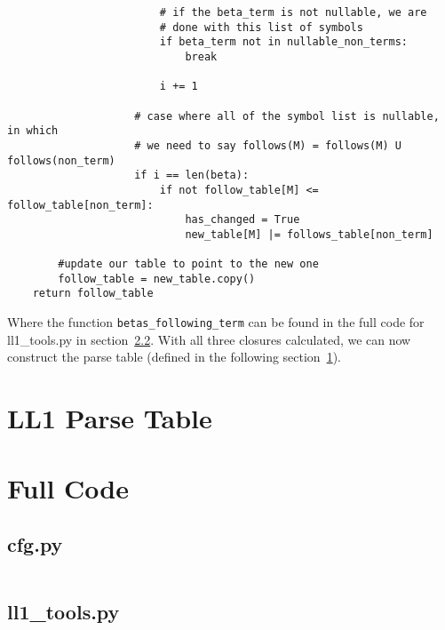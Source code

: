 \documentclass{article}
\begin{document}
\begin{verbatim}
                        # if the beta_term is not nullable, we are
                        # done with this list of symbols
                        if beta_term not in nullable_non_terms:
                            break

                        i += 1
                    
                    # case where all of the symbol list is nullable, in which
                    # we need to say follows(M) = follows(M) U follows(non_term)
                    if i == len(beta):
                        if not follow_table[M] <= follow_table[non_term]:
                            has_changed = True
                            new_table[M] |= follows_table[non_term]

        #update our table to point to the new one
        follow_table = new_table.copy()
    return follow_table
\end{verbatim}
\label{exerpt:follows}

Where the function \verb{betas_following_term{ can be found in the full code for ll1\_tools.py in section~\ref{code:ll1_tools}. With all three closures calculated, we can now construct the parse table (defined in the following section~\ref{sec:ll1}).

\section{LL1 Parse Table}
\label{sec:ll1}

\section{Full Code}
\label{code}

\subsection{cfg.py}
\label{code:cfg}
\inputminted{python}{./cfg.py}
\newpage

\subsection{ll1\_tools.py}
\label{code:ll1_tools}
\inputminted{python}{./ll1_tools.py}
\newpage
\end{document}
